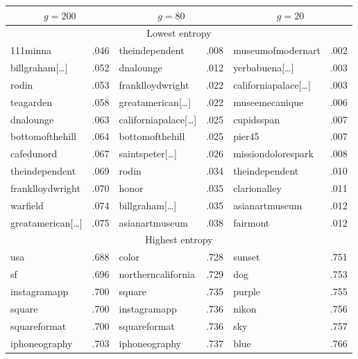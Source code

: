 \begin{table}[ht]
\centering
\setlength{\tabcolsep}{0.8em}
\begin{tabular}{lclclc}
\toprule
 \multicolumn{2}{c}{$g=200$}&  \multicolumn{2}{c}{$g=80$}&  \multicolumn{2}{c}{$g=20$}  \\
\midrule
\multicolumn{6}{c}{Lowest entropy} \\
\midrule
111minna         & .046 & theindependent         & .008 & museumofmodernart   & .002 \\
billgraham[…]    & .052 & dnalounge              & .012 & yerbabuena[…]       & .003 \\
rodin            & .053 & franklloydwright       & .022 & californiapalace[…] & .003 \\
teagarden        & .058 & greatamerican[…]       & .022 & museemecanique      & .006 \\
dnalounge        & .063 & californiapalace[…]    & .025 & cupidsspan          & .007 \\
bottomofthehill  & .064 & bottomofthehill        & .025 & pier45              & .007 \\
cafedunord       & .067 & saintspeter[…]         & .026 & missiondolorespark  & .008 \\
theindependent   & .069 & rodin                  & .034 & theindependent      & .010 \\
franklloydwright & .070 & honor                  & .035 & clarionalley        & .011 \\
warfield         & .074 & billgraham[…]          & .035 & asianartmuseum      & .012 \\
greatamerican[…] & .075 & asianartmuseum         & .038 & fairmont            & .012 \\
\midrule
\multicolumn{6}{c}{Highest entropy} \\
\midrule
usa              & .688 & color                  & .728 & sunset              & .751 \\
sf               & .696 & northerncalifornia     & .729 & dog                 & .753 \\
instagramapp     & .700 & square                 & .735 & purple              & .755 \\
square           & .700 & instagramapp           & .736 & nikon               & .756 \\
squareformat     & .700 & squareformat           & .736 & sky                 & .757 \\
iphoneography    & .703 & iphoneography          & .737 & blue                & .766 \\

\end{tabular}
\end{table}

